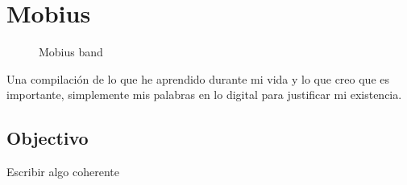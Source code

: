 \chapter{Mobius}
\begin{figure}[htbp]
    \centering
    
    \caption{Mobius band}
\end{figure}
Una compilación de lo que he aprendido durante mi vida y lo que creo que es importante, simplemente
mis palabras en lo digital para justificar mi existencia.

\section{Objectivo}
Escribir algo coherente

